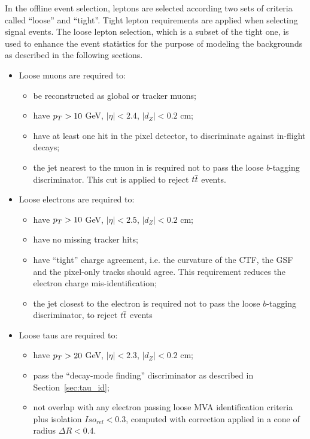 In the offline event selection, leptons are selected according two sets of criteria called ``loose'' and ``tight''. %
Tight lepton requirements are applied when selecting signal events. The loose lepton selection, which is a subset of the tight one, is used to enhance the event statistics for the purpose of modeling the backgrounds as described in the following sections.

\begin{itemize}
\item Loose muons are required to:
\begin{itemize}
\item be reconstructed as global or tracker muons;
\item have $p_{T} > 10$ GeV, $|\eta| < 2.4$, $|d_Z| < 0.2$ cm;
\item have at least one hit in the pixel detector, to discriminate against in-flight decays;
\item the jet nearest to the muon in \DR is required not to pass the loose $b$-tagging discriminator. This cut is applied to reject $t\overline{t}$ events.
\end{itemize}

\item Loose electrons are required to:
\begin{itemize}
\item have $p_{T} > 10$ GeV, $|\eta| < 2.5$, $|d_Z| < 0.2$ cm;
\item have no missing tracker hits; 
\item have ``tight'' charge agreement, i.e. the curvature of the CTF, the GSF and the pixel-only tracks should agree. This requirement reduces the electron charge mis-identification;
\item the jet closest to the electron is required not to pass the loose $b$-tagging discriminator, to reject $t\overline{t}$ events
\end{itemize}

\item Loose taus are required to:
\begin{itemize}
\item have $p_{T} > 20$ GeV, $|\eta| < 2.3$, $|d_Z| < 0.2$ cm;
\item pass the ``decay-mode finding'' discriminator as described in Section~\ref{sec:tau_id}; 
\item not overlap with any electron passing loose MVA identification criteria plus isolation $Iso_{rel} < 0.3$, computed with \db correction applied in a cone of radius $\Delta R < 0.4$.
\end{itemize}

\end{itemize}

